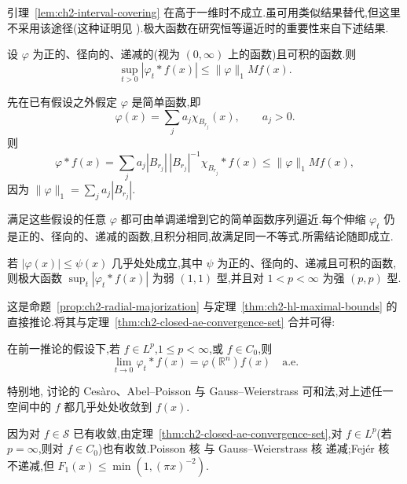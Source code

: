 引理~\ref{lem:ch2-interval-covering} 在高于一维时不成立.虽可用类似结果替代,但这里不采用该途径(这种证明见 ).极大函数在研究恒等逼近时的重要性来自下述结果.

\begin{Proposition}
\label{prop:ch2-radial-majorization}
设 $\varphi$ 为正的、径向的、递减的(视为 $(0,\infty)$ 上的函数)且可积的函数.则
\[
 \sup_{t>0}|\varphi_t*f(x)|\le\|\varphi\|_1Mf(x).
\]
\end{Proposition}

\hypertarget{sample-page-044}{}
\begin{Proof}
先在已有假设之外假定 $\varphi$ 是简单函数,即
\[
 \varphi(x)=\sum_ja_j\chi_{B_{r_j}}(x),\qquad a_j>0.
\]
则
\[
 \varphi*f(x)=\sum_ja_j|B_{r_j}|\,|B_{r_j}|^{-1}\chi_{B_{r_j}}*f(x)
 \le\|\varphi\|_1Mf(x),
\]
因为 $\|\varphi\|_1=\sum_ja_j|B_{r_j}|$.

满足这些假设的任意 $\varphi$ 都可由单调递增到它的简单函数序列逼近.每个伸缩 $\varphi_t$ 仍是正的、径向的、递减的函数,且积分相同,故满足同一不等式.所需结论随即成立.
\end{Proof}

\begin{Corollary}
\label{cor:ch2-kernel-maximal-bound}
若 $|\varphi(x)|\le\psi(x)$ 几乎处处成立,其中 $\psi$ 为正的、径向的、递减且可积的函数,则极大函数 $\sup_t|\varphi_t*f(x)|$ 为弱 $(1,1)$ 型,并且对 $1<p<\infty$ 为强 $(p,p)$ 型.
\end{Corollary}

这是命题~\ref{prop:ch2-radial-majorization} 与定理~\ref{thm:ch2-hl-maximal-bounds} 的直接推论.将其与定理~\ref{thm:ch2-closed-ae-convergence-set} 合并可得:

\begin{Corollary}
\label{cor:ch2-approximation-ae-convergence}
在前一推论的假设下,若 $f\in L^p$,$1\le p<\infty$,或 $f\in C_0$,则
\[
 \lim_{t\to0}\varphi_t*f(x)=\varphi(\mathbb R^n)f(x)\quad\text{a.e.}
\]
\end{Corollary}
特别地, 讨论的 Cesàro、Abel--Poisson 与 Gauss--Weierstrass 可和法,对上述任一空间中的 $f$ 都几乎处处收敛到 $f(x)$.

\begin{Proof}
因为对 $f\in\mathcal S$ 已有收敛,由定理~\ref{thm:ch2-closed-ae-convergence-set},对 $f\in L^p$(若 $p=\infty$,则对 $f\in C_0$)也有收敛.Poisson 核  与 Gauss--Weierstrass 核  递减;Fejér 核  不递减,但 $F_1(x)\le\min(1,(\pi x)^{-2})$.
\end{Proof}


